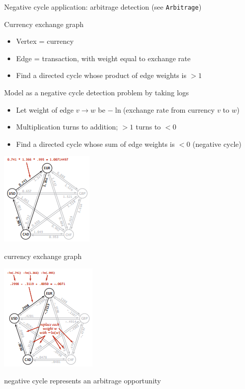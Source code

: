 \documentclass[8pt,a4paper,compress]{beamer}
\begin{document}
\begin{frame}[fragile]
\begin{minipage}{200pt}
Negative cycle application: arbitrage detection (see \lstinline{Arbitrage})

\bigskip

Currency exchange graph
\begin{itemize}
\item Vertex = currency

\item Edge = transaction, with weight equal to exchange rate

\item Find a directed cycle whose product of edge weights is $> 1$
\end{itemize}

\bigskip

Model as a negative cycle detection problem by taking logs
\begin{itemize}
\item Let weight of edge $v \to w$ be $-\ln$(exchange rate from currency $v$ to $w$)

\item Multiplication turns to addition; $> 1$ turns to $< 0$

\item Find a directed cycle whose sum of edge weights is $< 0$ (negative cycle)
\end{itemize}
\end{minipage}%
\begin{minipage}{100pt}
\begin{center}
\includegraphics[scale=0.43]{./figures/sp7.png}

\smallskip

\small currency exchange graph

\includegraphics[scale=0.43]{./figures/sp8.png}

\smallskip

\small negative cycle represents an arbitrage opportunity
\end{center}
\end{minipage}
\end{frame}
\end{document}

